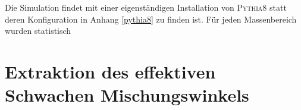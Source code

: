 Die Simulation findet mit einer eigenständigen Installation von
\textsc{Pythia8} statt deren Konfiguration in Anhang \ref{pythia8} zu finden
ist. Für jeden Massenbereich wurden statistisch




\section{Extraktion des effektiven Schwachen Mischungswinkels}
\label{afb:sin2theta}

 


